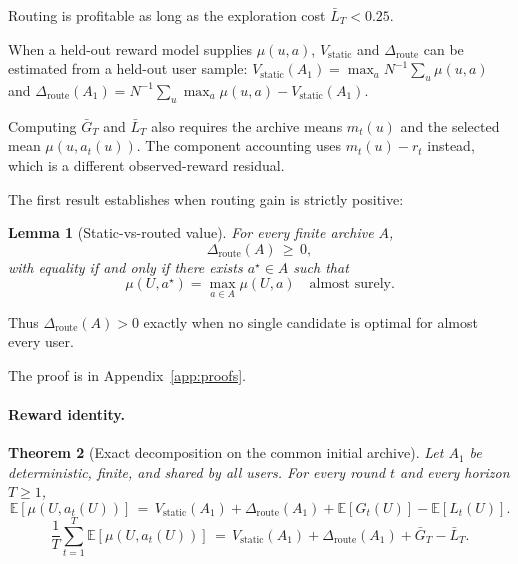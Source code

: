 \documentclass{article} %
\newtheorem{theorem}{Theorem}
\newtheorem{lemma}[theorem]{Lemma}
\providecommand{\E}{\mathbb{E}}
\begin{document}
Routing is profitable as long as the exploration cost $\bar L_T < 0.25$.

When a held-out reward model supplies \(\mu(u,a)\),
\(V_{\mathrm{static}}\) and \(\Delta_{\mathrm{route}}\) can be estimated from a
held-out user sample:
\(V_{\mathrm{static}}(A_1)=\max_a N^{-1}\sum_u\mu(u,a)\) and
\(\Delta_{\mathrm{route}}(A_1)
=N^{-1}\sum_u\max_a\mu(u,a)-V_{\mathrm{static}}(A_1)\).

Computing \(\bar G_T\) and \(\bar L_T\) also requires the archive means
\(m_t(u)\) and the selected mean \(\mu(u,a_t(u))\). The component accounting uses
\(m_t(u)-r_t\) instead, which is a different observed-reward residual.

\label{sec:method-lem-het}

The first result establishes when routing gain is strictly positive:

\begin{lemma}[Static-vs-routed value]
\label{lem:hetero}
For every finite archive $A$,
\begin{equation}
\label{eq:lem-hetero}
\Delta_{\mathrm{route}}(A) \,\ge\, 0,
\end{equation}
with equality if and only if there exists $a^\star \in A$ such that
\begin{equation}
\label{eq:lem-hetero-eq}
\mu(U, a^\star) = \max_{a \in A} \mu(U,a) \quad \text{almost surely.}
\end{equation}
\end{lemma}

Thus \(\Delta_{\mathrm{route}}(A)>0\) exactly when no single candidate is
optimal for almost every user.

The proof is in Appendix~\ref{app:proofs}.

\paragraph{Reward identity.}

\label{sec:method-thm-decomp}

\begin{theorem}[Exact decomposition on the common initial archive]
\label{thm:decomp}
Let $A_1$ be deterministic, finite, and shared by all users. For every round $t$ and every horizon $T \ge 1$,
\begin{equation}
\label{eq:thm-decomp-pointwise}
\E[\mu(U, a_t(U))]
\,=\, V_{\mathrm{static}}(A_1) + \Delta_{\mathrm{route}}(A_1) + \E[G_t(U)] - \E[L_t(U)].
\end{equation}
\begin{equation}
\label{eq:thm-decomp-avg}
\frac{1}{T}\sum_{t=1}^T \E[\mu(U, a_t(U))]
\,=\, V_{\mathrm{static}}(A_1) + \Delta_{\mathrm{route}}(A_1) + \bar G_T - \bar L_T.
\end{equation}
\end{theorem}
\end{document}
